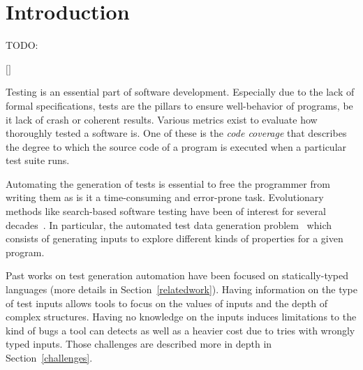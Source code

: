 \documentclass{llncs2e/llncs}
\makeatletter
\def\todo#1{{\color{red}TODO\@: #1}}
\def\addref#1{{\color{red}$[$#1$]$}}
\makeatother
\begin{document}
\vfill

\begin{abstract}
  \todo{}
Despite popular usage, most of the dynamically typed languages still lack
automated test data generation tools.  Most of the existing tools and
approaches depend critically on static and explicit types, which makes it hard
to port any of them over to dynamically typed languages. In this paper we
present a search-based test data generation tool, NAME, which focuses on
primitive types and lists of Python. NAME not only searches for test input
values but also for appropriate types for each input argument. We evaluate NAME
based on the structural coverage it achieves, the cost of the type search, and
the overhead for the execution of the function under test. We further discuss
the future of automated testing for dynamic and object-oriented languages based
on our experience.
\end{abstract}
%
\newpage


\section{Introduction}
\todo{}

\addref{}

Testing is an essential part of software development. Especially due to the lack
of formal specifications, tests are the pillars to ensure well-behavior of
programs, be it lack of crash or coherent results. Various metrics exist to
evaluate how thoroughly tested a software is. One of these is the \textit{code
coverage} that describes the degree to which the source code of a program is
executed when a particular test suite runs.

Automating the generation of tests is essential to free the programmer from
writing them as is it a time-consuming and error-prone task. Evolutionary
methods like search-based software testing have been of interest for several
decades~\cite{miller1976automatic}. In particular, the automated test data
generation problem~\cite{korel1990automated} which consists of generating inputs
to explore different kinds of properties for a given program.

Past works on test generation automation have been focused on statically-typed
languages (more details in Section~\ref{relatedwork}). Having information on the
type of test inputs allows tools to focus on the values of inputs and the depth
of complex structures. Having no knowledge on the inputs induces limitations to
the kind of bugs a tool can detects as well as a heavier cost due to tries with
wrongly typed inputs. Those challenges are described more in depth in
Section~\ref{challenges}.
\end{document}
